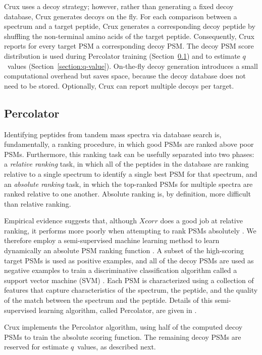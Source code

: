 \documentclass{bioinfo}
\renewcommand{\cite}{\citep}
\begin{document}
Crux uses a decoy strategy; however, rather than generating a fixed
decoy database, Crux generates decoys on the fly.  For each comparison
between a spectrum and a target peptide, Crux generates a
corresponding decoy peptide by shuffling the non-terminal amino acids
of the target peptide.  Consequently, Crux reports for every target
PSM a corresponding decoy PSM.  The decoy PSM score distribution is
used during Percolator training (Section~\ref{section:percolator}) and
to estimate $q$~values (Section~\ref{section:q-value}).  On-the-fly
decoy generation introduces a small computational overhead but saves
space, because the decoy database does not need to be stored.
Optionally, Crux can report multiple decoys per target.

\subsection{Percolator}
\label{section:percolator}

Identifying peptides from tandem mass spectra via database search is,
fundamentally, a ranking procedure, in which good PSMs are ranked
above poor PSMs.  Furthermore, this ranking task can be usefully
separated into two phases: a {\em relative ranking} task, in which all
of the peptides in the database are ranking relative to a single
spectrum to identify a single best PSM for that spectrum, and an {\em
absolute ranking} task, in which the top-ranked PSMs for multiple
spectra are ranked relative to one another.  Absolute ranking is, by
definition, more difficult than relative ranking.

Empirical evidence suggests that, although $Xcorr$ does a good job at
relative ranking, it performs more poorly when attempting to rank PSMs
absolutely \cite{keller:empirical, anderson:new}.  We therefore employ
a semi-supervised machine learning method to learn dynamically an
absolute PSM ranking function \cite{kall:semi-supervised}.  A subset
of the high-scoring target PSMs is used as positive examples, and all
of the decoy PSMs are used as negative examples to train a
discriminative classification algorithm called a support vector
machine (SVM) \cite{boser:training, noble:what}.  Each PSM is
characterized using a collection of features that capture
characteristics of the spectrum, the peptide, and the quality of the
match between the spectrum and the peptide.  Details of this
semi-supervised learning algorithm, called Percolator, are given in
\citet{kall:semi-supervised}.

Crux implements the Percolator algorithm, using half of the computed
decoy PSMs to train the absolute scoring function.  The remaining
decoy PSMs are reserved for estimate $q$~values, as described next.
\end{document}
